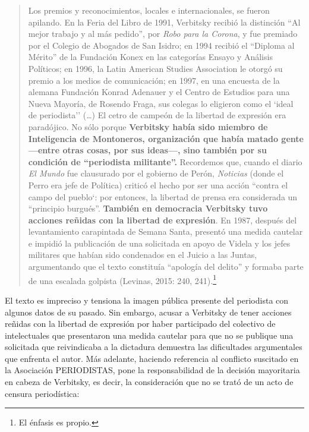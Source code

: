{\begin{quote}
Los premios y reconocimientos, locales e internacionales, se fueron apilando. En la Feria del Libro de 1991, Verbitsky recibió la distinción ``Al mejor trabajo y al más pedido'', por \emph{Robo para la Corona}, y fue premiado por el Colegio de Abogados de San Isidro; en 1994 recibió el ``Diploma al Mérito'' de la Fundación Konex en las categorías Ensayo y Análisis Políticos; en 1996, la Latin American Studies Association le otorgó su premio a los medios de comunicación; en 1997, en una encuesta de la alemana Fundación Konrad Adenauer y el Centro de Estudios para una Nueva Mayoría, de Rosendo Fraga, sus colegas lo eligieron como el `ideal de periodista'' (\ldots) El cetro de campeón de la libertad de expresión era paradójico. No sólo porque \textbf{Verbitsky había sido miembro de Inteligencia de Montoneros, organización que había matado gente ---entre otras cosas, por sus ideas---, sino también por su condición de ``periodista militante''.} Recordemos que, cuando el diario \emph{El Mundo} fue clausurado por el gobierno de Perón, \emph{Noticias} (donde el Perro era jefe de Política) criticó el hecho por ser una acción ``contra el campo del pueblo`: por entonces, la libertad de prensa era considerada un ``principio burgués''. \textbf{También en democracia Verbitsky tuvo acciones reñidas con la libertad de expresión}. En 1987, después del levantamiento carapintada de Semana Santa, presentó una medida cautelar e impidió la publicación de una solicitada en apoyo de Videla y los jefes militares que habían sido condenados en el Juicio a las Juntas, argumentando que el texto constituía ``apología del delito'' y formaba parte de una escalada golpista (Levinas, 2015: 240, 241).\footnote{El énfasis es propio.}
\end{quote}

El texto es impreciso y tensiona la imagen pública presente del periodista con algunos datos de su pasado. Sin embargo, acusar a Verbitsky de tener acciones reñidas con la libertad de expresión por haber participado del colectivo de intelectuales que presentaron una medida cautelar para que no se publique una solicitada que reivindicaba a la dictadura demuestra las dificultades argumentales que enfrenta el autor. Más adelante, haciendo referencia al conflicto suscitado en la Asociación PERIODISTAS, pone la responsabilidad de la decisión mayoritaria en cabeza de Verbitsky, es decir, la consideración que no se trató de un acto de censura periodística:

}
